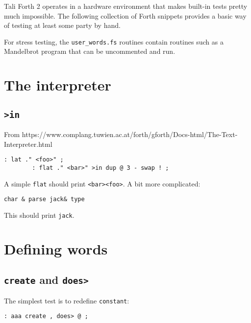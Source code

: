 
Tali Forth 2 operates in a hardware environment that makes built-in
tests pretty much impossible. The following collection of
Forth snippets provides a basic way of testing at least some party by hand.

For stress testing, the \texttt{user\_words.fs} routines contain routines such as
a Mandelbrot program that can be uncommented and run.

\section{The interpreter}

\subsection{\texttt{>in}}

From
https://www.complang.tuwien.ac.at/forth/gforth/Docs-html/The-Text-Interpreter.html

\begin{lstlisting}[frame=lines]
        : lat ." <foo>" ;
        : flat ." <bar>" >in dup @ 3 - swap ! ; 
\end{lstlisting}

\noindent A simple \texttt{flat} should print \texttt{<bar><foo>}. A bit more complicated:

\begin{lstlisting}[frame=lines]
        char & parse jack& type
\end{lstlisting}

\noindent This should print \texttt{jack}.


\section{Defining words}

\subsection{\texttt{create} and \texttt{does>}}
The simplest test is to redefine \texttt{constant}:

\begin{lstlisting}[frame=lines]
        : aaa create , does> @ ; 
\end{lstlisting}


